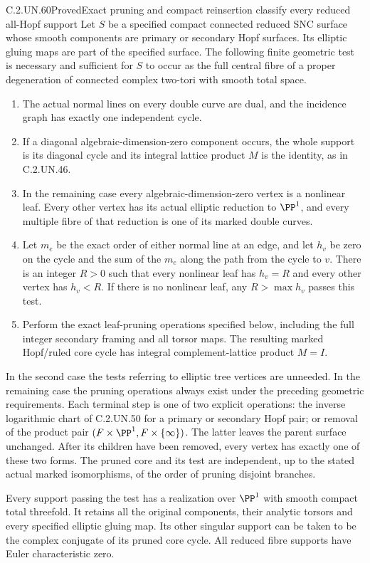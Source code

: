 \begin{statement}{C.2.UN.60}{Proved}{Exact pruning and compact reinsertion classify every reduced all-Hopf support}
Let $S$ be a specified compact connected reduced SNC surface whose
smooth components are primary or secondary Hopf surfaces. Its
elliptic gluing maps are part of the specified surface. The following
finite geometric test is necessary and sufficient for $S$ to occur
as the full central fibre of a proper degeneration of connected
complex two-tori with smooth total space.

\begin{enumerate}
\item The actual normal lines on every double curve are dual, and
the incidence graph has exactly one independent cycle.
\item If a diagonal algebraic-dimension-zero component occurs, the
whole support is its diagonal cycle and its integral lattice product
$M$ is the identity, as in C.2.UN.46.
\item In the remaining case every algebraic-dimension-zero vertex
is a nonlinear leaf. Every other vertex has its actual elliptic
reduction to $\PP^1$, and every multiple fibre of that reduction
is one of its marked double curves.
\item Let $m_e$ be the exact order of either normal line at an edge,
and let $h_v$ be zero on the cycle and the sum of the $m_e$ along
the path from the cycle to $v$. There is an integer $R>0$ such that
every nonlinear leaf has $h_v=R$ and every other vertex has $h_v<R$.
If there is no nonlinear leaf, any $R>\max h_v$ passes this test.
\item Perform the exact leaf-pruning operations specified below,
including the full integer secondary framing and all torsor maps.
The resulting marked Hopf/ruled core cycle has integral
complement-lattice product $M=I$.
\end{enumerate}

In the second case the tests referring to elliptic tree vertices are
unneeded. In the remaining case the pruning operations always exist
under the preceding geometric requirements. Each terminal step is
one of two explicit operations: the inverse logarithmic chart of
C.2.UN.50 for a primary or secondary Hopf pair; or removal of the
product pair $(F\times\PP^1,F\times\{\infty\})$. The latter leaves
the parent surface unchanged. After its children have been removed,
every vertex has exactly one of these two forms. The pruned core
and its test are independent, up to the stated actual marked
isomorphisms, of the order of pruning disjoint branches.

Every support passing the test has a realization over $\PP^1$
with smooth compact total threefold. It retains all the original
components, their analytic torsors and every specified elliptic
gluing map. Its other singular support can be taken to be the
complex conjugate of its pruned core cycle. All reduced fibre
supports have Euler characteristic zero.
\end{statement}

